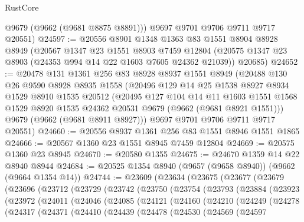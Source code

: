 \begin{lexlean}{RustCore}
\begin{coremodule}
        @9679
        (@9662 (@9681 @8875 @8891)))
      @9697
      @9701
      @9706
      @9711
      @9717
      @20551)
@24597 := @20556
    @8901
    @1348
    @1363
    @83
    @1551
    @8904
    @8928
    @8949
    (@20567
      @1347
      @23
      @1551
      @8903
      @7459
      @12804
      (@20575 @1347 @23 @8903 (@24353 @994 @14 @22 @1603 @7605 @24362 @21039))
      @20685)
@24652 := @20478
    @131
    @1361
    @256
    @83
    @8928
    @8937
    @1551
    @8949
    (@20488
      @130
      @26
      @9590
      @8928
      @8935
      @1558
      (@20496
        @129
        @14
        @25
        @1538
        @8927
        @8934
        @1529
        @8910
        @1535
        @20512
        (@20495
          @127
          @104
          @14
          @11
          @1603
          @1551
          @1568
          @1529
          @8920
          @1535
          @24362
          @20531
          @9679
          (@9662 (@9681 @8921 @1551)))
        @9679
        (@9662 (@9681 @8911 @8927)))
      @9697
      @9701
      @9706
      @9711
      @9717
      @20551)
@24660 := @20556 @8937 @1361 @256 @83 @1551 @8946 @1551 @1865
@24666 := @20567 @1360 @23 @1551 @8945 @7459 @12804
@24669 := @20575 @1360 @23 @8945
@24670 := @20580 @1355
@24675 := @24670 @1359 @14 @22 @8940 @8944
@24684 := @20525 @1354 @8940 (@9657 (@9658 @8940)) (@9662 (@9664 @1354 @14))
@24744 := @23609
    (@23634
      (@23675
        (@23677
          (@23679
            (@23696
              (@23712
                (@23729
                  (@23742
                    (@23750
                      (@23754
                        (@23793
                          (@23884
                            (@23923
                              (@23972
                                (@24011
                                  (@24046
                                    (@24085
                                      (@24121
                                        (@24160
                                          (@24210
                                            (@24249
                                              (@24278
                                                (@24317
                                                  (@24371
                                                    (@24410
                                                      (@24439
                                                        (@24478
                                                          (@24530
                                                            (@24569
                                                              (@24597

\end{coremodule}
\end{lexlean}

